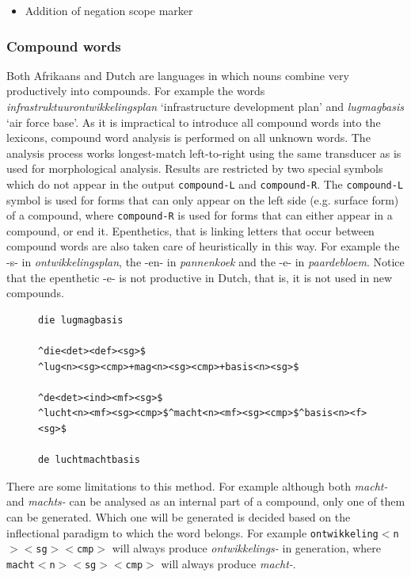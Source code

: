 \documentclass[11pt]{article}
\begin{document}
\begin{itemize}
\item Addition of negation scope marker
\end{itemize}


\subsubsection{Compound words}


Both Afrikaans and Dutch are languages in which nouns combine very
productively into compounds. For example the words {\em infrastruktuurontwikkelingsplan}
`infrastructure development plan' and {\em lugmagbasis}
`air force base'. As it is impractical to introduce
all compound words into the lexicons, compound word analysis is performed on
all unknown words. The analysis process works longest-match left-to-right
using the same transducer as is used for morphological analysis.
Results are restricted by two special
symbols which do not appear in the output {\small {\tt compound-L}} and {\small {\tt compound-R}}.
The {\small {\tt compound-L}} symbol is used for forms that can only appear on the
left side (e.g. surface form) of a compound, where {\small {\tt compound-R}} is
used for forms that can either appear in a compound, or end it.
Epenthetics, that is linking letters that occur between compound words
are also taken care of heuristically in this way. For example the -s-
in \emph{ontwikkelingsplan}, the -en- in \emph{pannenkoek} and the -e- in \emph{paardebloem}.
Notice that the epenthetic -e- is not productive in Dutch, that is, it is not used in new compounds.

\begin{figure}
\begin{small}
\begin{verbatim}
die lugmagbasis

^die<det><def><sg>$
^lug<n><sg><cmp>+mag<n><sg><cmp>+basis<n><sg>$

^de<det><ind><mf><sg>$
^lucht<n><mf><sg><cmp>$^macht<n><mf><sg><cmp>$^basis<n><f><sg>$

de luchtmachtbasis
\end{verbatim}
\end{small}
\end{figure}

There are some limitations to this method. For example although
both {\em macht-} and {\em machts-} can be analysed as an internal part
of a compound, only one of them can be generated. Which one will be generated
is decided based on the inflectional paradigm to which the word belongs. For
example {\small {\tt ontwikkeling$<$n$><$sg$><$cmp$>$}} will always produce {\em ontwikkelings-} in generation,
where {\small {\tt macht$<$n$><$sg$><$cmp$>$}} will always produce {\em macht-}.
\end{document}
